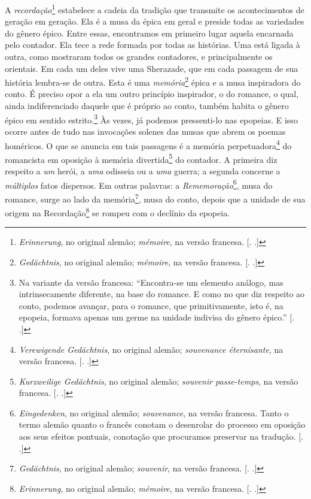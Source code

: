 A \emph{recordação}\footnote{\emph{Erinnerung}, no original alemão;
  \emph{mémoire}, na versão francesa. [. .]} estabelece a
cadeia da tradição que transmite os acontecimentos de geração em
geração. Ela é a musa da épica em geral e preside todas as variedades do
gênero épico. Entre essas, encontramos em primeiro lugar aquela
encarnada pelo contador. Ela tece a rede formada por todas as histórias.
Uma está ligada à outra, como mostraram todos os grandes contadores, e
principalmente os orientais. Em cada um deles vive uma Sherazade, que em
cada passagem de sua história lembra-se de outra. Esta é uma
\emph{memória}\footnote{\emph{Gedächtnis}, no original alemão;
  \emph{mémoire}, na versão francesa. [. .]} épica e a musa
inspiradora do conto. É preciso opor a ela um outro princípio
inspirador, o do romance, o qual, ainda indiferenciado daquele que é
próprio ao conto, também habita o gênero épico em sentido
estrito.\footnote{Na variante da versão francesa: ``Encontra-se um
  elemento análogo, mas intrinsecamente diferente, na base do romance. E
  como no que diz respeito ao conto, podemos avançar, para o romance,
  que primitivamente, isto é, na epopeia, formava apenas um germe na
  unidade indivisa do gênero épico.'' [. .]} Às vezes, já
podemos pressenti-lo nas epopeias. E isso ocorre antes de tudo nas
invocações solenes das musas que abrem os poemas homéricos. O que se
anuncia em tais passagens é a memória perpetuadora\footnote{\emph{Verewigende
  Gedächtnis}, no original alemão; \emph{souvenance éternisante}, na
  versão francesa. [. .]} do romancista em oposição à memória
divertida\footnote{\emph{Kurzweilige Gedächtnis}, no original alemão;
  \emph{souvenir passe-temps}, na versão francesa. [. .]} do
contador. A primeira diz respeito a \emph{um} herói, a \emph{uma}
odisseia ou a \emph{uma} guerra; a segunda concerne a \emph{múltiplos}
fatos dispersos. Em outras palavras: a \emph{Rememoração}\footnote{\emph{Eingedenken},
  no original alemão; \emph{souvenance}, na versão francesa. Tanto o
  termo alemão quanto o francês conotam o desenrolar do processo em
  oposição aos seus efeitos pontuais, conotação que procuramos preservar
  na tradução. [. .]}, musa do romance, surge ao lado da
memória\footnote{\emph{Gedächtnis}, no original alemão; \emph{souvenir},
  na versão francesa. [. .]}, musa do conto, depois que a
unidade de sua origem na Recordação\footnote{\emph{Erinnerung}, no
  original alemão; \emph{mémoire}, na versão francesa. [. .]}
se rompeu com o declínio da epopeia.

